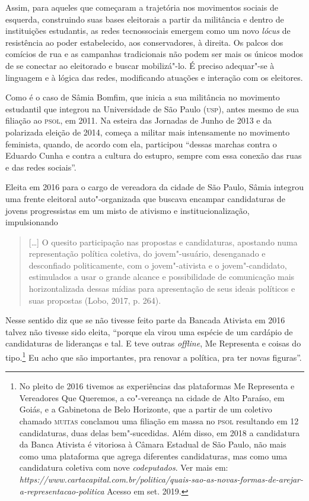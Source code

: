 Assim, para aqueles que começaram a trajetória nos movimentos sociais de
esquerda, construindo suas bases eleitorais a partir da militância e
dentro de instituições estudantis, as redes tecnossociais emergem como
um novo \emph{lócus} de resistência ao poder estabelecido, aos
conservadores, à direita. Os palcos dos comícios de rua e as campanhas
tradicionais não podem ser mais os únicos modos de se conectar ao
eleitorado e buscar mobilizá"-lo. É preciso adequar"-se à linguagem e à
lógica das redes, modificando atuações e interação com os eleitores.

Como é o caso de Sâmia Bomfim, que inicia a sua militância no movimento
estudantil que integrou na Universidade de São Paulo (\textsc{usp}), antes mesmo
de sua filiação ao \textsc{psol}, em 2011. Na esteira das Jornadas de Junho de
2013 e da polarizada eleição de 2014, começa a militar mais intensamente
no movimento feminista, quando, de acordo com ela, participou ``dessas
marchas contra o Eduardo Cunha e contra a cultura do estupro, sempre com
essa conexão das ruas e das redes sociais''.

Eleita em 2016 para o cargo de vereadora da cidade de São Paulo, Sâmia
integrou uma frente eleitoral auto"-organizada que buscava encampar
candidaturas de jovens progressistas em um misto de ativismo e
institucionalização, impulsionando

\begin{quote}
{[}\ldots{}{]} O quesito participação nas propostas e candidaturas, apostando
numa representação política coletiva, do jovem"-usuário, desenganado e
desconfiado politicamente, com o jovem"-ativista e o jovem"-candidato,
estimulados a usar o grande alcance e possibilidade de comunicação mais
horizontalizada dessas mídias para apresentação de seus ideais políticos
e suas propostas (Lobo, 2017, p. 264).
\end{quote}

Nesse sentido diz que se não tivesse feito parte da Bancada Ativista em
2016 talvez não tivesse sido eleita, ``porque ela virou uma espécie de
um cardápio de candidaturas de lideranças e tal. E teve outras \emph{offline},
Me Representa e coisas do tipo.\footnote{No pleito de 2016 tivemos as
  experiências das plataformas Me Representa e Vereadores Que Queremos,
  a co"-vereança na cidade de Alto Paraíso, em Goiás, e a Gabinetona de
  Belo Horizonte, que a partir de um coletivo chamado \textsc{muitas} conclamou
  uma filiação em massa no \textsc{psol} resultando em 12 candidaturas, duas
  delas bem"-sucedidas. Além disso, em 2018 a candidatura da Banca
  Ativista é vitoriosa à Câmara Estadual de São Paulo, não mais como uma
  plataforma que agrega diferentes candidaturas, mas como uma
  candidatura coletiva com nove \emph{codeputados}. Ver mais em:
  \emph{https://www.cartacapital.com.br/politica/quais-sao-as-novas-formas-de-arejar-a-representacao-politica}
  Acesso em set. 2019.} Eu acho que são importantes, pra renovar a
política, pra ter novas figuras''.

